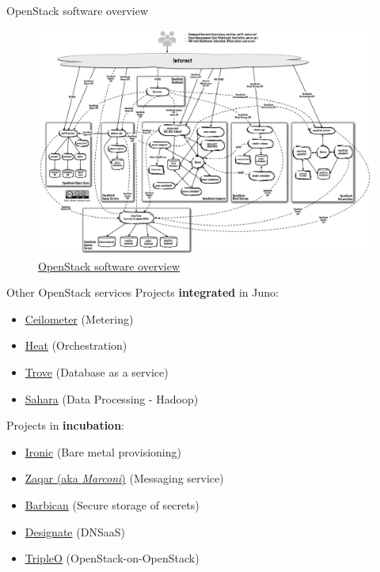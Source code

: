 \documentclass[english,serif,mathserif,usenames,dvipsnames]{beamer}
\begin{document}
\begin{frame}
  {OpenStack software overview}
  \begin{figure}[ht]
    \centering
    \includegraphics[width=\linewidth]{openstack-arch-havana-logical-v1.jpg}
    
  \caption*{\href{http://docs.openstack.org/training-guides/content/figures/5/a/figures/openstack-arch-havana-logical-v1.jpg}{OpenStack software overview}}
\end{figure}
\end{frame}

\begin{frame}
  {Other OpenStack services}
  Projects \textbf{integrated} in Juno:
  \begin{itemize}
  \item \href{https://wiki.openstack.org/wiki/Ceilometer}{Ceilometer}
    (Metering)
  \item \href{https://wiki.openstack.org/wiki/Heat}{Heat}
    (Orchestration)
  \item \href{https://wiki.openstack.org/wiki/Trove}{Trove} (Database
    as a service)
  \item \href{https://wiki.openstack.org/wiki/Sahara}{Sahara} (Data
    Processing - Hadoop)
  \end{itemize}

\+
  Projects in \textbf{incubation}:
  \begin{itemize}
  \item \href{https://wiki.openstack.org/wiki/Ironic}{Ironic} (Bare
    metal provisioning)
  \item \href{https://wiki.openstack.org/wiki/Zaqar}{Zaqar (aka
      \textit{Marconi})} (Messaging service)
  \item \href{https://wiki.openstack.org/wiki/Barbican}{Barbican}
    (Secure storage of secrets)
  \item \href{https://wiki.openstack.org/wiki/Designate}{Designate} (DNSaaS)
  \item \href{https://wiki.openstack.org/wiki/TripleO}{TripleO} (OpenStack-on-OpenStack)
  \end{itemize}
\end{frame}
\end{document}
